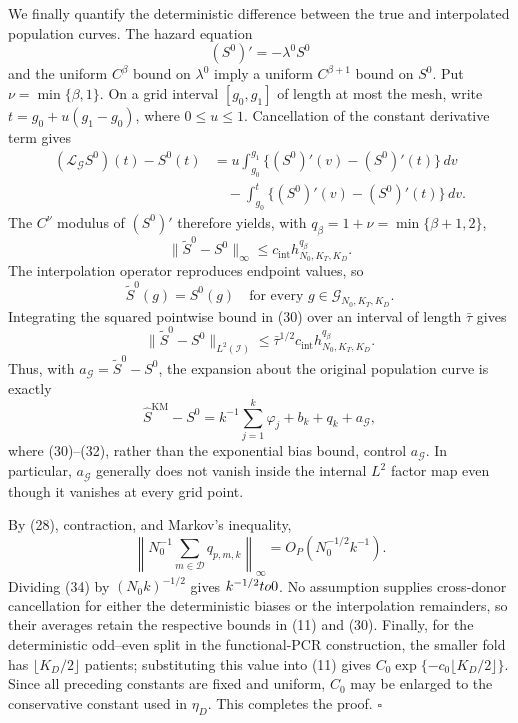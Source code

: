 We finally quantify the deterministic difference between the true and interpolated population curves.  The hazard equation
\[
 (S^0)'=-\lambda^0S^0
\]
and the uniform \(C^\beta\) bound on \(\lambda^0\) imply a uniform \(C^{\beta+1}\) bound on \(S^0\).  Put \(\nu=\min\{\beta,1\}\).  On a grid interval \([g_0,g_1]\) of length at most the mesh, write \(t=g_0+u(g_1-g_0)\), where \(0\le u\le1\).  Cancellation of the constant derivative term gives
\[
 \begin{aligned}
 (\mathcal L_{\mathcal G}S^0)(t)-S^0(t)
 &=u\int_{g_0}^{g_1}\{(S^0)'(v)-(S^0)'(t)\}\,dv\\
 &\quad-\int_{g_0}^{t}\{(S^0)'(v)-(S^0)'(t)\}\,dv.
 \end{aligned}
\]
The \(C^\nu\) modulus of \((S^0)'\) therefore yields, with \(q_\beta=1+\nu=\min\{\beta+1,2\}\),
\[
 \|\widetilde S^0-S^0\|_\infty
 \le c_{\mathrm{int}}h_{N_0,K_T,K_D}^{q_\beta}.              \tag{30}
\]
The interpolation operator reproduces endpoint values, so
\[
 \widetilde S^0(g)=S^0(g)
 \quad\text{for every }g\in\mathcal G_{N_0,K_T,K_D}.         \tag{31}
\]
Integrating the squared pointwise bound in (30) over an interval of length \(\bar\tau\) gives
\[
 \|\widetilde S^0-S^0\|_{L^2(\mathcal I)}
 \le \bar\tau^{1/2}c_{\mathrm{int}}
 h_{N_0,K_T,K_D}^{q_\beta}.                                  \tag{32}
\]
Thus, with \(a_{\mathcal G}=\widetilde S^0-S^0\), the expansion about the original population curve is exactly
\[
 \widehat S^{\mathrm{KM}}-S^0
 =k^{-1}\sum_{j=1}^k\varphi_j+b_k+q_k+a_{\mathcal G},        \tag{33}
\]
where (30)--(32), rather than the exponential bias bound, control \(a_{\mathcal G}\).  In particular, \(a_{\mathcal G}\) generally does not vanish inside the internal \(L^2\) factor map even though it vanishes at every grid point.

By (28), contraction, and Markov's inequality,
\[
 \left\|N_0^{-1}\sum_{m\in\mathcal D}q_{p,m,k}\right\|_\infty
 =O_P(N_0^{-1/2}k^{-1}).                                    \tag{34}
\]
Dividing (34) by \((N_0k)^{-1/2}\) gives \(k^{-1/2}\\to0\).  No assumption supplies cross-donor cancellation for either the deterministic biases or the interpolation remainders, so their averages retain the respective bounds in (11) and (30).  Finally, for the deterministic odd--even split in the functional-PCR construction, the smaller fold has \(\lfloor K_D/2\rfloor\) patients; substituting this value into (11) gives \(C_0\exp\{-c_0\lfloor K_D/2\rfloor\}\).  Since all preceding constants are fixed and uniform, \(C_0\) may be enlarged to the conservative constant used in \(\eta_D\).  This completes the proof. \(\square\)